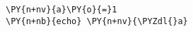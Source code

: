 \begin{Verbatim}[commandchars=\\\{\}]
\PY{n+nv}{a}\PY{o}{=}1
\PY{n+nb}{echo} \PY{n+nv}{\PYZdl{}a}
\end{Verbatim}
